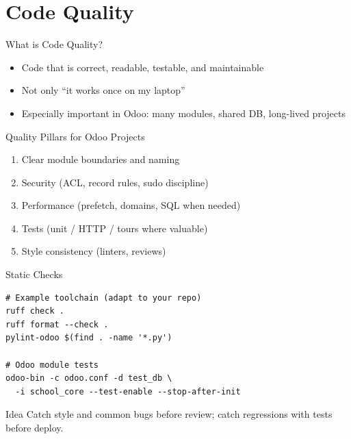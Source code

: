 \section{Code Quality}

\begin{frame}{What is Code Quality?}
\begin{itemize}
  \item Code that is correct, readable, testable, and maintainable
  \item Not only ``it works once on my laptop''
  \item Especially important in Odoo: many modules, shared DB, long-lived projects
\end{itemize}
\end{frame}

\begin{frame}{Quality Pillars for Odoo Projects}
\begin{enumerate}
  \item Clear module boundaries and naming
  \item Security (ACL, record rules, sudo discipline)
  \item Performance (prefetch, domains, SQL when needed)
  \item Tests (unit / HTTP / tours where valuable)
  \item Style consistency (linters, reviews)
\end{enumerate}
\end{frame}

\begin{frame}[fragile]{Static Checks}
\begin{lstlisting}[style=bash]
# Example toolchain (adapt to your repo)
ruff check .
ruff format --check .
pylint-odoo $(find . -name '*.py')

# Odoo module tests
odoo-bin -c odoo.conf -d test_db \
  -i school_core --test-enable --stop-after-init
\end{lstlisting}

\vspace{0.4em}
\begin{block}{Idea}
  Catch style and common bugs before review; catch regressions with tests before deploy.
\end{block}
\end{frame}

